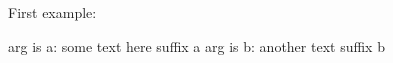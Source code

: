 First example:
\begin{argument}
  arg is a: some text here suffix a
  arg is b: another text suffix b
\end{argument}
